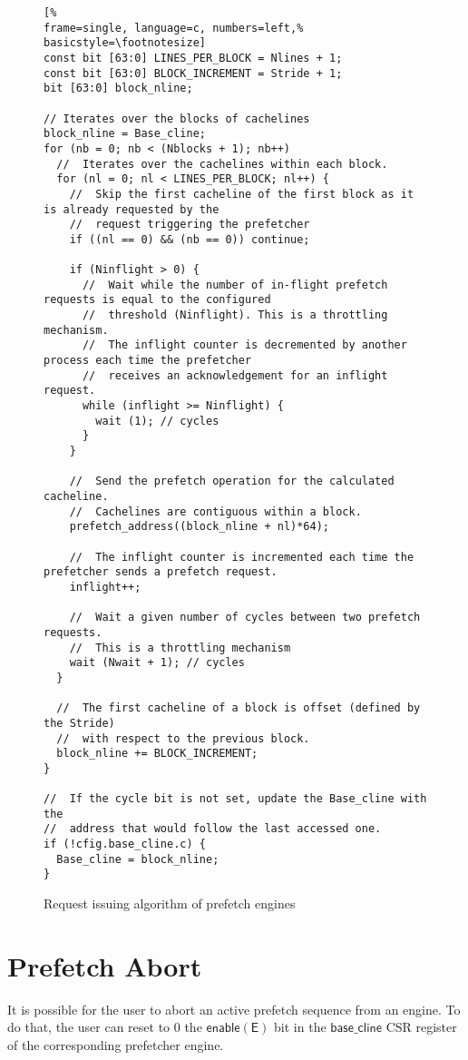 \documentclass[10pt,titlepage,twoside]{book}
\begin{document}
\begin{figure}[hptb]
\begin{lstlisting}[%
frame=single, language=c, numbers=left,%
basicstyle=\footnotesize]
const bit [63:0] LINES_PER_BLOCK = Nlines + 1;
const bit [63:0] BLOCK_INCREMENT = Stride + 1;
bit [63:0] block_nline;

// Iterates over the blocks of cachelines
block_nline = Base_cline;
for (nb = 0; nb < (Nblocks + 1); nb++)
  //  Iterates over the cachelines within each block.
  for (nl = 0; nl < LINES_PER_BLOCK; nl++) {
    //  Skip the first cacheline of the first block as it is already requested by the
    //  request triggering the prefetcher
    if ((nl == 0) && (nb == 0)) continue;

    if (Ninflight > 0) {
      //  Wait while the number of in-flight prefetch requests is equal to the configured
      //  threshold (Ninflight). This is a throttling mechanism.
      //  The inflight counter is decremented by another process each time the prefetcher
      //  receives an acknowledgement for an inflight request.
      while (inflight >= Ninflight) {
        wait (1); // cycles
      }
    }

    //  Send the prefetch operation for the calculated cacheline.
    //  Cachelines are contiguous within a block.
    prefetch_address((block_nline + nl)*64);

    //  The inflight counter is incremented each time the prefetcher sends a prefetch request.
    inflight++;

    //  Wait a given number of cycles between two prefetch requests.
    //  This is a throttling mechanism
    wait (Nwait + 1); // cycles
  }

  //  The first cacheline of a block is offset (defined by the Stride)
  //  with respect to the previous block.
  block_nline += BLOCK_INCREMENT;
}

//  If the cycle bit is not set, update the Base_cline with the
//  address that would follow the last accessed one.
if (!cfig.base_cline.c) {
  Base_cline = block_nline;
}
\end{lstlisting}
\caption{Request issuing algorithm of prefetch engines}
\end{figure}

\section{Prefetch Abort}

It is possible for the user to abort an active prefetch sequence from an engine.
To do that, the user can reset to 0 the $\mathsf{enable(E)}$ bit in the $\mathsf{base\_cline}$ \ac{CSR} register of the corresponding prefetcher engine.
\end{document}
